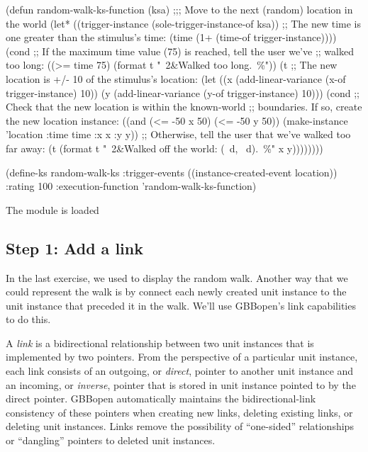 \documentclass[10pt,twoside,english,pdftex]{article}
\begin{document}
\begin{example}
  (defun random-walk-ks-function (ksa)
    ;;; Move to the next (random) location in the world
    (let* ((trigger-instance (sole-trigger-instance-of ksa))
           ;; The new time is one greater than the stimulus's time:
           (time (1+ (time-of trigger-instance))))
      (cond
       ;; If the maximum time value (75) is reached, tell the user we've
       ;; walked too long:
       ((>= time 75) (format t "~2&Walked too long.~\%"))
       (t ;; The new location is +/- 10 of the stimulus's location:
        (let ((x (add-linear-variance (x-of trigger-instance) 10))
              (y (add-linear-variance (y-of trigger-instance) 10)))
          (cond
           ;; Check that the new location is within the known-world
           ;; boundaries.  If so, create the new location instance:
           ((and (<= -50 x 50) (<= -50 y 50))
            (make-instance 'location 
              :time time 
              :x x 
              :y y))
           ;; Otherwise, tell the user that we've walked too far away:
           (t (format t "~2&Walked off the world: (~d, ~d).~\%" x y))))))))

  (define-ks random-walk-ks
      :trigger-events ((instance-created-event location))
      :rating 100
      :execution-function 'random-walk-ks-function)
\end{example}

\begin{tightitemize}
\item The  module is loaded
\end{tightitemize}

\subsection*{Step 1: Add  a link}

In the last exercise, we used  to
display the random walk.  Another way that we could represent the walk is by
connect each newly created  unit instance to the
 unit instance that preceded it in the walk.  We'll use
GBBopen's link capabilities to do this.

A \textit{link} is a bidirectional relationship between two unit instances
that is implemented by two pointers. From the perspective of a particular unit
instance, each link consists of an outgoing, or \textit{direct}, pointer to
another unit instance and an incoming, or \textit{inverse}, pointer that is
stored in unit instance pointed to by the direct pointer.  GBBopen
automatically maintains the bidirectional-link consistency of these pointers
when creating new links, deleting existing links, or deleting unit instances.
Links remove the possibility of ``one-sided'' relationships or ``dangling''
pointers to deleted unit instances.
\end{document}
